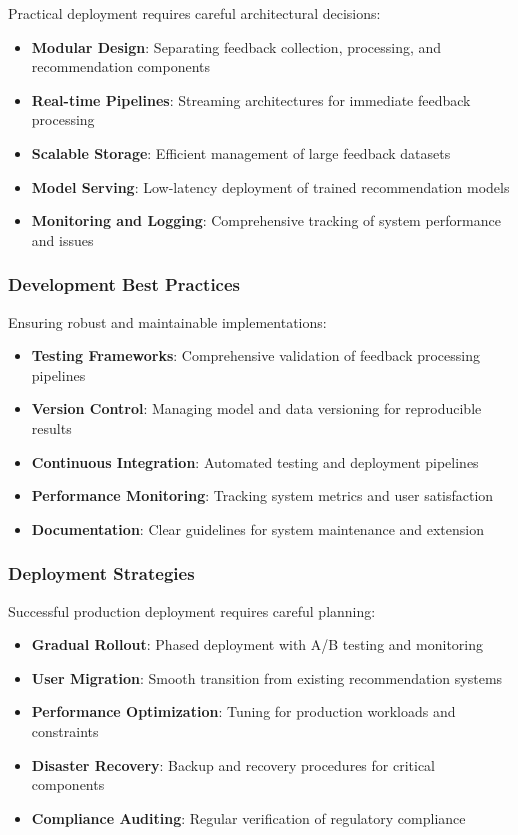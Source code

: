 Practical deployment requires careful architectural decisions:

\begin{itemize}
    \item \textbf{Modular Design}: Separating feedback collection, processing, and recommendation components
    \item \textbf{Real-time Pipelines}: Streaming architectures for immediate feedback processing
    \item \textbf{Scalable Storage}: Efficient management of large feedback datasets
    \item \textbf{Model Serving}: Low-latency deployment of trained recommendation models
    \item \textbf{Monitoring and Logging}: Comprehensive tracking of system performance and issues
\end{itemize}

\subsubsection{Development Best Practices}

Ensuring robust and maintainable implementations:

\begin{itemize}
    \item \textbf{Testing Frameworks}: Comprehensive validation of feedback processing pipelines
    \item \textbf{Version Control}: Managing model and data versioning for reproducible results
    \item \textbf{Continuous Integration}: Automated testing and deployment pipelines
    \item \textbf{Performance Monitoring}: Tracking system metrics and user satisfaction
    \item \textbf{Documentation}: Clear guidelines for system maintenance and extension
\end{itemize}

\subsubsection{Deployment Strategies}

Successful production deployment requires careful planning:

\begin{itemize}
    \item \textbf{Gradual Rollout}: Phased deployment with A/B testing and monitoring
    \item \textbf{User Migration}: Smooth transition from existing recommendation systems
    \item \textbf{Performance Optimization}: Tuning for production workloads and constraints
    \item \textbf{Disaster Recovery}: Backup and recovery procedures for critical components
    \item \textbf{Compliance Auditing}: Regular verification of regulatory compliance
\end{itemize}

